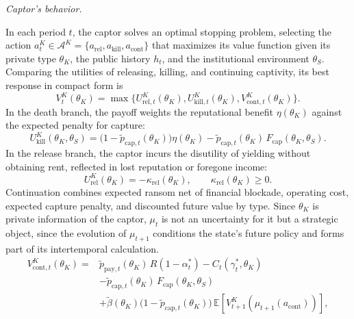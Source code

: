 \documentclass[pdflatex,sn-mathphys-ay]{sn-jnl}
\theoremstyle{plain}
\theoremstyle{definition}
\newcommand{\E}{\mathbb{E}}
\newcommand{\1}{\mathbf{1}}
\begin{document}
\noindent\textit{Captor's behavior.}

\noindent In each period $t$, the captor solves an optimal stopping problem, selecting the action $a_t^K\in\mathcal{A}^K=\{a_{\mathrm{rel}},a_{\mathrm{kill}},a_{\mathrm{cont}}\}$ that maximizes its value function given its private type $\theta_K$, the public history $h_t$, and the institutional environment $\theta_S$. Comparing the utilities of releasing, killing, and continuing captivity, its best response in compact form is
\begin{equation}
V^K_t(\theta_K)=
\max\{U^K_{\mathrm{rel},t}(\theta_K),
U^K_{\mathrm{kill},t}(\theta_K),
V^K_{\mathrm{cont},t}(\theta_K)\}.
\label{eq:k-bellman}
\end{equation}
In the death branch, the payoff weights the reputational benefit $\eta(\theta_K)$ against the expected penalty for capture:
\begin{equation}
U^K_{\mathrm{kill}}(\theta_K,\theta_S)=\bigl(1-\tilde{p}_{\mathrm{cap},t}(\theta_K)\bigr)\eta(\theta_K)-\tilde{p}_{\mathrm{cap},t}(\theta_K)\,F_{\mathrm{cap}}(\theta_K,\theta_S).
\label{eq:k-kill}
\end{equation}
In the release branch, the captor incurs the disutility of yielding without obtaining rent, reflected in lost reputation or foregone income:
\begin{equation}
U^K_{\mathrm{rel}}(\theta_K)=-\kappa_{\mathrm{rel}}(\theta_K),\qquad\kappa_{\mathrm{rel}}(\theta_K)\ge 0.
\label{eq:k-rel}
\end{equation}
Continuation combines expected ransom net of financial blockade, operating cost, expected capture penalty, and discounted future value by type. Since $\theta_K$ is private information of the captor, $\mu_t$ is not an uncertainty for it but a strategic object, since the evolution of $\mu_{t+1}$ conditions the state's future policy and forms part of its intertemporal calculation.
\begin{equation}
\begin{aligned}
V^K_{\mathrm{cont},t}(\theta_K)
={}&\tilde{p}_{\mathrm{pay},t}(\theta_K)\,R(1-\alpha_t^\ast)
-C_t(\gamma_t^\ast,\theta_K)\\
&-\tilde{p}_{\mathrm{cap},t}(\theta_K)\,F_{\mathrm{cap}}(\theta_K,\theta_S)\\
&+\tilde{\beta}(\theta_K)\bigl(1-\tilde{p}_{\mathrm{cap},t}(\theta_K)\bigr)\,\E\!\left[V^K_{t+1}\!\left(\mu_{t+1}(a_{\mathrm{cont}})\right)\right],
\end{aligned}
\label{eq:kidnapper-cont}
\end{equation}
\end{document}
